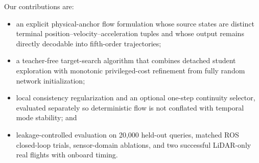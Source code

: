 Our contributions are:
\begin{itemize}
    \item an explicit physical-anchor flow formulation whose source states are distinct terminal position--velocity--acceleration tuples and whose output remains directly decodable into fifth-order trajectories;
    \item a teacher-free target-search algorithm that combines detached student exploration with monotonic privileged-cost refinement from fully random network initialization;
    \item local consistency regularization and an optional one-step continuity selector, evaluated separately so deterministic flow is not conflated with temporal mode stability; and
    \item leakage-controlled evaluation on 20,000 held-out queries, matched ROS closed-loop trials, sensor-domain ablations, and two successful LiDAR-only real flights with onboard timing.
\end{itemize}
